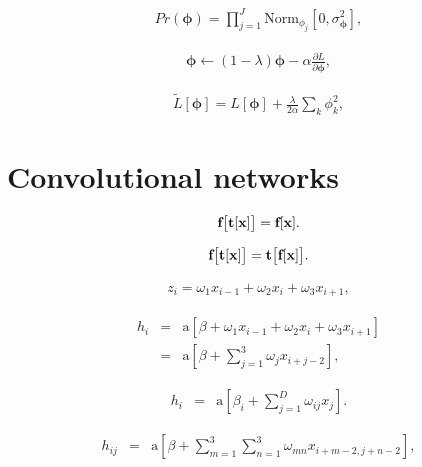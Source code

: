 \documentclass[letterpaper,twoside,openany, titlepage,oldfontcommands,titles,dvipsnames]{memoir}
\begin{document}
\begin{eqnarray}
 Pr(\boldsymbol\phi) = \prod_{j=1}^{J}\mbox{Norm}_{\phi_j}[0, \sigma^{2}_{\boldsymbol\phi}],
 \end{eqnarray}

\begin{eqnarray}
 \boldsymbol\phi \longleftarrow (1-\lambda) \boldsymbol\phi - \alpha \frac{\partial L}{\partial \boldsymbol\phi},
 \end{eqnarray}

\begin{eqnarray}
 \tilde{L}[\boldsymbol\phi] = L[\boldsymbol\phi] + \frac{\lambda}{2\alpha} \sum_{k}\phi_{k}^2,
 \end{eqnarray}

\chapter{Convolutional networks}

\begin{eqnarray}
  \mbox{\bf f}\bigl[\mbox{\bf t}[\mathbf{x}]\bigr] = \mbox{\bf f}[\mathbf{x}].
 \end{eqnarray}

\begin{eqnarray}
  \mbox{\bf f}\bigl[\mbox{\bf t}[\mathbf{x}]\bigr] = \mbox{\bf t}\bigl[\mbox{\bf f}[\mathbf{x}]\bigr].
 \end{eqnarray}

\begin{eqnarray}\label{eq:conv_kernel_3a}
  z_{i} = \omega_{1}x_{i-1}+\omega_{2}x_{i} + \omega_{3}x_{i+1},
 \end{eqnarray}

\begin{eqnarray}\label{eq:conv_kernel_3}
  h_{i} &=& \mbox{a}\left[\beta + \omega_{1}x_{i-1}+\omega_{2}x_{i} + \omega_{3}x_{i+1}\right]\nonumber\\
  &=& \mbox{a}\left[\beta + \sum_{j=1}^{3} \omega_{j} x_{i+j-2}\right],
 \end{eqnarray}

\begin{eqnarray}\label{eq:conv_fully}
  h_{i} &=& \mbox{a}\left[\beta_{i} + \sum_{j=1}^{D} \omega_{ij} x_{j}\right].
 \end{eqnarray}

\begin{eqnarray}\label{eq:conv_kernel_2d}
  h_{ij} &=& \mbox{a}\left[\beta + \sum_{m=1}^{3}\sum_{n=1}^{3} \omega_{mn} x_{i+m-2,j+n-2}\right],
 \end{eqnarray}
\end{document}
